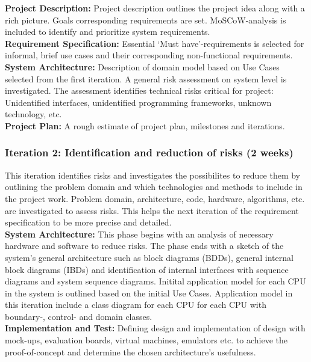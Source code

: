 \textbf{Project Description:} Project description outlines the project idea along with a rich picture. Goals corresponding requirements are set. MoSCoW-analysis is included to identify and prioritize system requirements. \\
\textbf{Requirement Specification:} Essential `Must have'-requirements is selected for informal, brief use cases and their corresponding non-functional requirements. \\
\textbf{System Architecture:} Description of domain model based on Use Cases selected from the first iteration. A general risk assessment on system level is investigated. The assessment identifies technical risks critical for project: Unidentified interfaces, unidentified programming frameworks, unknown technology, etc. \\
\textbf{Project Plan:} A rough estimate of project plan, milestones and iterations.

\subsubsection{Iteration 2: Identification and reduction of risks (2 weeks)}
This iteration identifies risks and investigates the possibilites to reduce them by outlining the problem domain and which technologies and methods to include in the project work.
Problem domain, architecture, code, hardware, algorithms, etc. are investigated to assess risks. This helps the next iteration  of the requirement specification to be more precise and detailed. \\

\textbf{System Architecture:} This phase begins with an analysis of necessary hardware and software to reduce risks. The phase ends with a sketch of the system's general architecture such as block diagrams (BDDs), general internal block diagrams (IBDs) and identification of internal interfaces with sequence diagrams and system sequence diagrams. Initital application model for each CPU in the system is outlined based on the initial Use Cases. Application model in this iteration include a class diagram for each CPU for each CPU with boundary-, control- and domain classes. \\

\textbf{Implementation and Test:} Defining design and implementation of design with mock-ups, evaluation boards, virtual machines, emulators etc. to achieve the proof-of-concept and determine the chosen architecture's usefulness. \\

